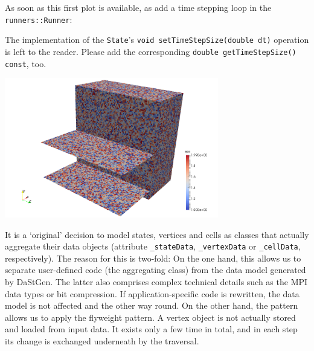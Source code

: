 As soon as this first plot is available, as add a time stepping loop in the
\texttt{runners::Runner}:


\noindent
The implementation of the \texttt{State}'s \texttt{void setTimeStepSize(double
dt)} operation is left to the reader. 
Please add the corresponding \texttt{double getTimeStepSize() const}, too.

\begin{center}
  \includegraphics[width=0.7\textwidth]{41_heat-equation/epsilon.png}
\end{center}



\begin{remark}
  It is a `original' decision to model states, vertices and cells as classes
  that actually aggregate their data objects (attribute \texttt{\_stateData},
  \texttt{\_vertexData} or \texttt{\_cellData}, respectively).
  The reason for this is two-fold:
  On the one hand, this allows us to separate user-defined code (the
  aggregating class) from the data model generated by DaStGen. The latter also
  comprises complex technical details such as the MPI data types or bit
  compression. If application-specific code is rewritten, the data model is not
  affected and the other way round. On the other hand, the pattern allows us to
  apply the flyweight pattern. A vertex object is not actually stored and loaded
  from input data. It exists only a few time in total, and in each step its
  change is exchanged underneath by the traversal.
\end{remark}




